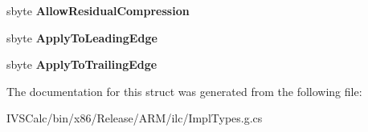 \begin{DoxyCompactItemize}
sbyte {\bfseries Allow\+Residual\+Compression}
\item 
\mbox{\label{struct_microsoft_1_1_graphics_1_1_canvas_1_1_text_1_1_canvas_justification_opportunity_____impl_1_1_unsafe_type_ae68c79843b3a76bcf23a2e78d14ad131}} 
sbyte {\bfseries Apply\+To\+Leading\+Edge}
\item 
\mbox{\label{struct_microsoft_1_1_graphics_1_1_canvas_1_1_text_1_1_canvas_justification_opportunity_____impl_1_1_unsafe_type_ab0eddaf7aa341e20c6f0258fa5ffad42}} 
sbyte {\bfseries Apply\+To\+Trailing\+Edge}
\end{DoxyCompactItemize}


The documentation for this struct was generated from the following file\+:\begin{DoxyCompactItemize}
\item 
I\+V\+S\+Calc/bin/x86/\+Release/\+A\+R\+M/ilc/Impl\+Types.\+g.\+cs\end{DoxyCompactItemize}
